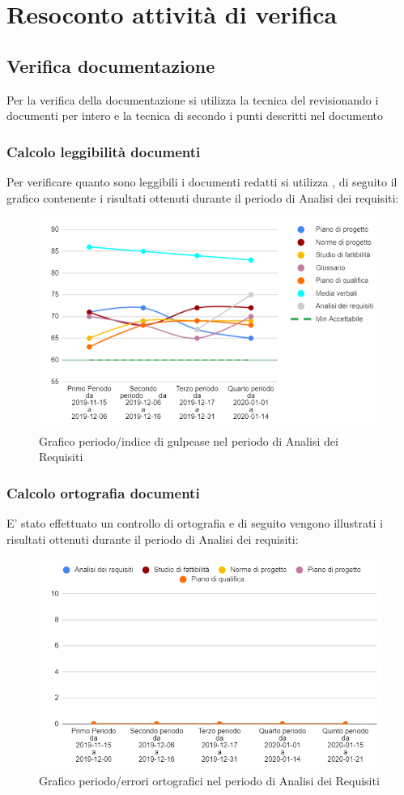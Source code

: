 \appendix
{}

\section{Resoconto attività di verifica}

\subsection{Verifica documentazione}
Per la verifica della documentazione si utilizza la tecnica del  revisionando i documenti per intero e la tecnica di  secondo i punti descritti nel documento 

\subsubsection{Calcolo leggibilità documenti}
Per verificare quanto sono leggibili i documenti redatti si utilizza , di seguito il grafico contenente i risultati ottenuti durante il periodo di Analisi dei requisiti:

\begin{figure}[H]
	\centering
	\includegraphics[width=0.8\linewidth]{./res/images/gulpease.png}
	\caption{Grafico periodo/indice di gulpease nel periodo di Analisi dei Requisiti}
	\label{fig:Grafico indice di gulpease periodo di Analisi dei Requisiti}
\end{figure}

\subsubsection{Calcolo ortografia documenti}
E' stato effettuato un controllo di ortografia e di seguito vengono illustrati i risultati ottenuti durante il periodo di Analisi dei requisiti:

\begin{figure}[H]
	\centering
	\includegraphics[width=0.8\linewidth]{./res/images/ortografia.png}
	\caption{Grafico periodo/errori ortografici nel periodo di Analisi dei Requisiti}
	\label{fig:Grafico errori ortografici periodo di Analisi dei Requisiti}
\end{figure}